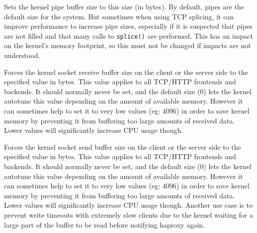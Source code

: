 \begin{keywords}
 

  Sets the kernel pipe buffer size to this size (in bytes). By default, pipes
  are the default size for the system. But sometimes when using TCP splicing,
  it can improve performance to increase pipe sizes, especially if it is
  suspected that pipes are not filled and that many calls to \verb|splice()| are
  performed. This has an impact on the kernel's memory footprint, so this must
  not be changed if impacts are not understood.

 
 

  Forces the kernel socket receive buffer size on the client or the server side
  to the specified value in bytes. This value applies to all TCP/HTTP frontends
  and backends. It should normally never be set, and the default size ($0$) lets
  the kernel autotune this value depending on the amount of available memory.
  However it can sometimes help to set it to very low values (eg: $4096$) in
  order to save kernel memory by preventing it from buffering too large amounts
  of received data. Lower values will significantly increase CPU usage though.

 
 

  Forces the kernel socket send buffer size on the client or the server side to
  the specified value in bytes. This value applies to all TCP/HTTP frontends
  and backends. It should normally never be set, and the default size ($0$) lets
  the kernel autotune this value depending on the amount of available memory.
  However it can sometimes help to set it to very low values (eg: $4096$) in
  order to save kernel memory by preventing it from buffering too large amounts
  of received data. Lower values will significantly increase CPU usage though.
  Another use case is to prevent write timeouts with extremely slow clients due
  to the kernel waiting for a large part of the buffer to be read before
  notifying haproxy again.


\end{keywords}
